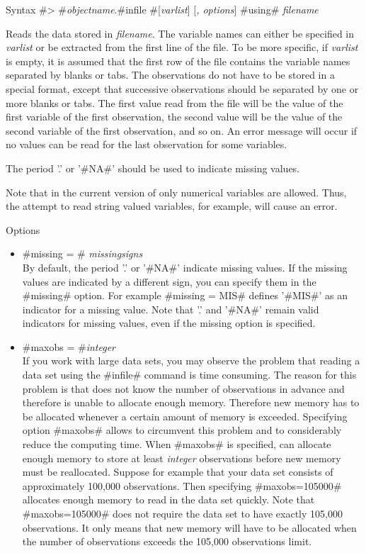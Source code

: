\begin{stanza}{Syntax}
#> #{\em objectname}.#infile #[{\em varlist}] [{\em , options}] #using# {\em filename}

Reads the data stored in {\em filename}. The variable names can either be specified in {\em varlist} or be extracted from the first line of the file. To be more specific, if {\em varlist} is empty, it is assumed that the first row of the file contains the variable names separated by blanks or tabs. The observations do not have to be stored in a special format, except that successive observations should be separated by one or more blanks or tabs. The first value read from the file will be the value of the first variable of the first observation, the second value will be the value of the second variable of the first observation, and so on. An error message will occur if no values can be read for the last observation for some variables.

The period '.' or '#NA#' should be used to indicate missing values.

Note that in the current version of \BayesX only numerical variables are allowed. Thus, the attempt to read string valued variables, for example, will cause an error.
\end{stanza}

\begin{stanza}{Options}
\begin{itemize}
\item #missing = # {\em missingsigns} \\
By default, the period '.' or '#NA#' indicate missing values. If the missing values are indicated by a different sign, you can specify them in the #missing# option. For example #missing = MIS# defines '#MIS#' as an indicator for a missing value. Note that '.' and '#NA#' remain valid indicators for missing values, even if the missing option is specified.

\item #maxobs = #{\em integer} \\
If you work with large data sets, you may observe the problem that reading a data set using the #infile# command is time consuming. The reason for this problem is that \BayesX does not know the number of observations in advance and therefore is unable to allocate enough memory. Therefore new memory has to be allocated whenever a certain amount of memory is exceeded. Specifying option #maxobs# allows to circumvent this problem and to considerably reduce the computing time. When #maxobs# is specified, \BayesX can allocate enough memory to store at least {\em integer} observations before new memory must be reallocated. Suppose for example that your data set consists of approximately 100,000 observations. Then specifying #maxobs=105000# allocates enough memory to read in the data set quickly. Note that #maxobs=105000# does not require the data set to have exactly 105,000 observations. It only means that new memory will have to be allocated when the number of observations exceeds the 105,000 observations limit.
\end{itemize}
\end{stanza}

